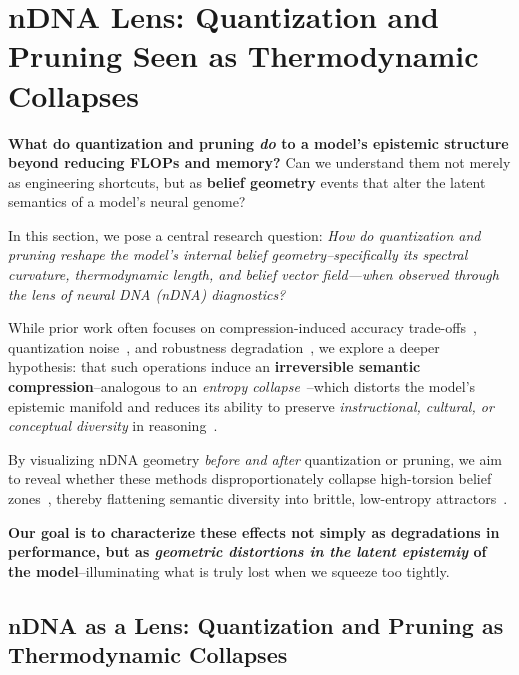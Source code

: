 




\section{nDNA Lens: Quantization and Pruning Seen as Thermodynamic Collapses}

\textbf{What do quantization and pruning \emph{do} to a model’s epistemic structure beyond reducing FLOPs and memory?} Can we understand them not merely as engineering shortcuts, but as \textbf{belief geometry} events that alter the latent semantics of a model's neural genome?

In this section, we pose a central research question:  
\emph{How do quantization and pruning reshape the model’s internal belief geometry--specifically its spectral curvature, thermodynamic length, and belief vector field---when observed through the lens of neural DNA (nDNA) diagnostics?}

While prior work often focuses on compression-induced accuracy trade-offs~\cite{han2015deep, frankle2018lottery, cheng2018model}, quantization noise~\cite{nagel2020up, zafrir2019q8bert}, and robustness degradation~\cite{guo2022mlprune, choukroun2019low}, we explore a deeper hypothesis: that such operations induce an \textbf{irreversible semantic compression}--analogous to an \emph{entropy collapse}~\cite{achille2018emergence}--which distorts the model’s epistemic manifold and reduces its ability to preserve \emph{instructional, cultural, or conceptual diversity} in reasoning~\cite{mu2020compositional, abid2021persistent}.

By visualizing nDNA geometry \emph{before and after} quantization or pruning, we aim to reveal whether these methods disproportionately collapse high-torsion belief zones~\cite{bishop2023geometric}, thereby flattening semantic diversity into brittle, low-entropy attractors~\cite{wang2023makes}.

\textbf{Our goal is to characterize these effects not simply as degradations in performance, but as \emph{geometric distortions in the latent epistemiy} of the model}--illuminating what is truly lost when we squeeze too tightly.



\subsection{nDNA as a Lens: Quantization and Pruning as Thermodynamic Collapses}

